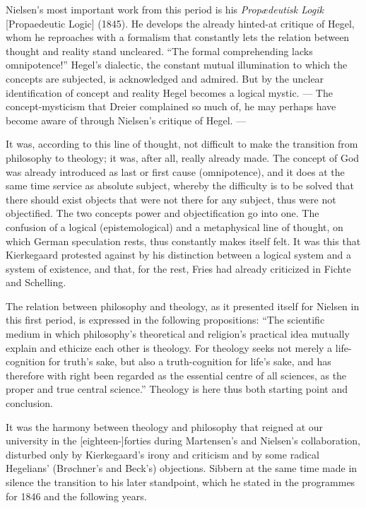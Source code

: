 \documentclass[12pt,a4paper]{book}
\newcommand{\opage}[1]{\marginnote{\footnotesize\textit{[#1]}}}
\begin{document}
Nielsen's most important work from this period is his \emph{Propædeutisk Logik} [Propaedeutic
Logic] (1845). He develops the already hinted-at critique of Hegel, whom he reproaches with a
formalism that constantly lets the relation between thought and reality stand uncleared. ``The
formal comprehending lacks omnipotence!'' Hegel's dialectic, the constant mutual illumination
to which the concepts \opage{186}are subjected, is acknowledged and admired. But by the unclear
identification of concept and reality Hegel becomes a logical mystic. --- The
concept-mysticism that Dreier complained so much of, he may perhaps have become aware of
through Nielsen's critique of Hegel. ---

It was, according to this line of thought, not difficult to make the transition from philosophy
to theology; it was, after all, really already made. The concept of God was already introduced
as last or first cause (omnipotence), and it does at the same time service as absolute subject,
whereby the difficulty is to be solved that there should exist objects that were not there for
any subject, thus were not objectified. The two concepts power and objectification go into one.
The confusion of a logical (epistemological) and a metaphysical line of thought, on which
German speculation rests, thus constantly makes itself felt. It was this that Kierkegaard
protested against by his distinction between a logical system and a system of existence, and
that, for the rest, Fries had already criticized in Fichte and Schelling.

The relation between philosophy and theology, as it presented itself for Nielsen in this first
period, is expressed in the following propositions: ``The scientific medium in which
philosophy's theoretical and religion's practical idea mutually explain and ethicize each
other is theology. For theology seeks not merely a life-cognition for truth's sake, but also a
truth-cognition for life's sake, and has therefore with right been regarded as the essential
centre of all sciences, as the proper and true central science.'' Theology is here thus both
starting point and conclusion.

It was the harmony between theology and philosophy that reigned at our university in the
[eighteen-]forties during Martensen's and Nielsen's collaboration, disturbed only by
Kierkegaard's irony and criticism and by some radical Hegelians' (Brøchner's and Beck's)
objections. Sibbern at the same time made in silence the transition to his later standpoint,
which he stated in the programmes for 1846 and the following years.
\end{document}
